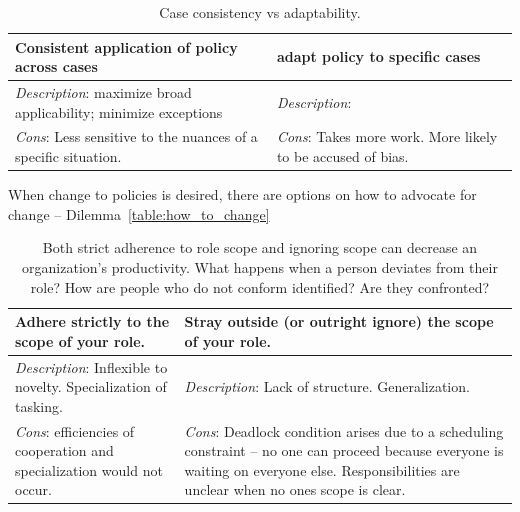 \begin{center}
\begin{table}[ht]
\begin{tabular}{ | m{\dilemmatablewidth}| m{\dilemmatablewidth} | }
  \hline
  \textbf{Consistent application of policy across cases} &
  \textbf{adapt policy to specific cases} \\
  \hline
  \textit{Description}: maximize broad applicability; minimize exceptions &
  \textit{Description}:  \\  
  \hline
  \textit{Cons}: Less sensitive to the nuances of a specific situation. & 
  \textit{Cons}: Takes more work. More likely to be accused of bias. \\
  \hline
\end{tabular}
\caption{Case consistency vs adaptability.
}
\label{table:policy_consistency_across_cases}
\end{table}
\end{center}

When change to policies is desired, there are options on how to advocate for change -- Dilemma~\ref{table:how_to_change} 

\begin{center}
\begin{table}[ht]
\begin{tabular}{ | m{\dilemmatablewidth}| m{\dilemmatablewidth} | } 
  \hline
  \textbf{Adhere strictly to the scope of your role.} & 
  \textbf{Stray outside (or outright ignore) the scope of your role.} \\ 
  \hline
  \textit{Description}: Inflexible to novelty. Specialization of tasking. & 
  \textit{Description}: Lack of structure. Generalization. \\ 
  \hline
  \textit{Cons}: efficiencies of cooperation and specialization would not occur. & 
  \textit{Cons}: Deadlock condition arises due to a scheduling constraint -- no one can proceed because everyone is waiting on everyone else. Responsibilities are unclear when no ones scope is clear. \\  
  \hline
\end{tabular}
\caption{Both strict adherence to role scope and ignoring scope can decrease an organization's productivity. 
What happens when a person deviates from their role?
How are people who do not conform identified? Are they confronted?
}
\label{table:scope_of_activity}
\end{table}
\end{center}

